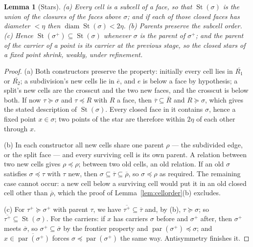 \documentclass[11pt,a4paper]{article}
\theoremstyle{jsplain}
\newtheorem{lemma}[theorem]{Lemma}
\theoremstyle{jsdefn}
\newcommand{\St}{\operatorname{St}}
\newcommand{\diam}{\operatorname{diam}}
\begin{document}
\begin{lemma}[Stars]\label{lem:stars}
\textup{(a)} Every cell is a subcell of a face, so that
$\St(\sigma)$ is the union of the closures of the faces above $\sigma$;
and if each of those closed faces has diameter $<\eta$ then
$\diam\St(\sigma)<2\eta$.
\textup{(b)} Parents preserve the subcell order.
\textup{(c)} Hence $\St(\sigma^{+})\subseteq\St(\sigma)$ whenever
$\sigma$ is the parent of $\sigma^{+}$; and the parent of the carrier
of a point is its carrier at the previous stage, so the closed stars of
a fixed point shrink, weakly, under refinement.
\end{lemma}
\begin{proof}
(a) Both constructors preserve the property: initially every cell lies
in $\overline{R_1}$ or $\overline{R_2}$; a subdivision's new cells lie
in $\overline e$, and $e$ is below a face by hypothesis; a split's new
cells are the crosscut and the two new faces, and the crosscut is below
both. If now $\tau\succeq\sigma$ and $\tau\preceq R$ with $R$ a face,
then $\overline\tau\subseteq\overline R$ and $R\succeq\sigma$, which
gives the stated description of $\St(\sigma)$. Every closed face in it
contains $\sigma$, hence a fixed point $x\in\sigma$; two points of the
star are therefore within $2\eta$ of each other through $x$.

(b) In each constructor all new cells share one parent $\rho$ --- the
subdivided edge, or the split face --- and every surviving cell is its
own parent. A relation between two new cells gives $\rho\preceq\rho$;
between two old cells, an old relation. If an old $\sigma$ satisfies
$\sigma\preceq\tau$ with $\tau$ new, then
$\sigma\subseteq\overline\tau\subseteq\overline\rho$, so
$\sigma\preceq\rho$ as required. The remaining case cannot occur: a new
cell below a surviving cell would put it in an old closed cell other
than $\overline\rho$, which the proof of
Lemma~\ref{lem:cellorder}(b) excludes.

(c) For $\tau^{+}\succeq\sigma^{+}$ with parent $\tau$, we have
$\overline{\tau^{+}}\subseteq\overline\tau$ and, by (b),
$\tau\succeq\sigma$; so $\overline{\tau^{+}}\subseteq\St(\sigma)$.
For the carriers: if $x$ has carriers $\sigma$ before and $\sigma^{+}$
after, then $\sigma^{+}$ meets $\overline\sigma$, so
$\sigma^{+}\subseteq\overline\sigma$ by the frontier property and
$\operatorname{par}(\sigma^{+})\preceq\sigma$; and
$x\in\overline{\operatorname{par}(\sigma^{+})}$ forces
$\sigma\preceq\operatorname{par}(\sigma^{+})$ the same way. Antisymmetry
finishes it.
\end{proof}
\end{document}
